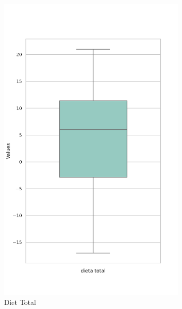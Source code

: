 \documentclass[jou]{apa7}
\newcommand{\subfigwidth}{0.2\textwidth}
\begin{document}
\begin{figure}[!ht]
	\centering
	\begin{subfigure}[b]{\subfigwidth}
		\centering
		\includegraphics[width=\linewidth]{Box_Plot_of_dieta_total.pdf}
		\caption{Diet Total}
		\label{fig:BoxPlotDietaTotal}
	\end{subfigure}
	\hspace{0.5em}
	\begin{subfigure}[b]{\subfigwidth}
		\centering

\end{subfigure}
\end{figure}
\end{document}
